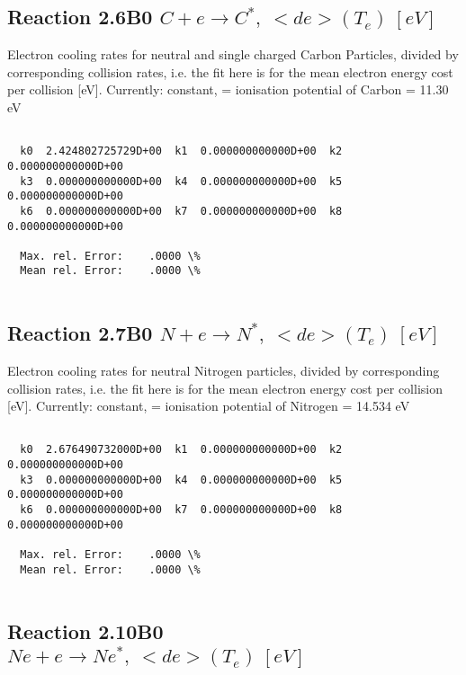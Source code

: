 \documentclass[12pt,dvipdfmx]{article}
\begin{document}
{\subsection{
Reaction 2.6B0   $  C + e  \rightarrow C^*,  \ <de>(T_e) \ [eV] $
}

 Electron cooling rates for neutral and single
 charged Carbon Particles, divided by corresponding collision rates,
i.e. the fit here is for the mean electron energy cost per collision [eV].
 Currently: constant, = ionisation potential of Carbon = 11.30 eV

\begin{small}\begin{verbatim}

  k0  2.424802725729D+00  k1  0.000000000000D+00  k2  0.000000000000D+00
  k3  0.000000000000D+00  k4  0.000000000000D+00  k5  0.000000000000D+00
  k6  0.000000000000D+00  k7  0.000000000000D+00  k8  0.000000000000D+00

  Max. rel. Error:    .0000 \%
  Mean rel. Error:    .0000 \%


\end{verbatim}\end{small}

\subsection{
Reaction 2.7B0   $  N + e  \rightarrow N^*,  \ <de>(T_e) \ [eV] $
}

 Electron cooling rates for neutral Nitrogen particles, divided by corresponding collision rates, i.e. the fit here is for the mean electron energy cost per collision [eV].
 Currently: constant, = ionisation potential of Nitrogen = 14.534 eV

\begin{small}\begin{verbatim}

  k0  2.676490732000D+00  k1  0.000000000000D+00  k2  0.000000000000D+00
  k3  0.000000000000D+00  k4  0.000000000000D+00  k5  0.000000000000D+00
  k6  0.000000000000D+00  k7  0.000000000000D+00  k8  0.000000000000D+00

  Max. rel. Error:    .0000 \%
  Mean rel. Error:    .0000 \%


\end{verbatim}\end{small}
\subsection{
Reaction 2.10B0   $  Ne + e \rightarrow Ne^*,  \ <de>(T_e) \ [eV] $
}

}
\end{document}
